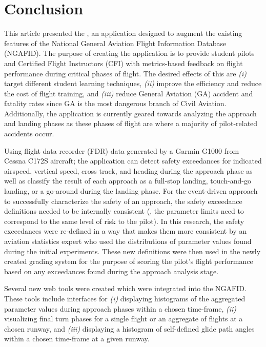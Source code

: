 
\section{Conclusion} \label{sec:conclusion}
	
	This article presented the \toolname, an application designed to augment the existing features of the National General Aviation Flight Information Database (NGAFID).  The purpose of creating the application is to provide student pilots and Certified Flight Instructors (CFI) with metrics-based feedback on flight performance during critical phases of flight.  The desired effects of this are \textit{(i)} target different student learning techniques, \textit{(ii)} improve the efficiency and reduce the cost of flight training, and \textit{(iii)} reduce General Aviation (GA) accident and fatality rates since GA is the most dangerous branch of Civil Aviation.  Additionally, the application is currently geared towards analyzing the approach and landing phases as these phases of flight are where a majority of pilot-related accidents occur.
	
	Using flight data recorder (FDR) data generated by a Garmin G1000 from Cessna C172S aircraft; the application can detect safety exceedances for indicated airspeed, vertical speed, cross track, and heading during the approach phase as well as classify the result of each approach as a full-stop landing, touch-and-go landing, or a go-around during the landing phase.  For the event-driven approach to successfully characterize the safety of an approach, the safety exceedance definitions needed to be internally consistent (\ie, the parameter limits need to correspond to the same level of risk to the pilot).  In this research, the safety exceedances were re-defined in a way that makes them more consistent by an aviation statistics expert who used the distributions of parameter values found during the initial experiments.  These new definitions were then used in the newly created grading system for the purpose of scoring the pilot's flight performance based on any exceedances found during the approach analysis stage.
	
	Several new web tools were created which were integrated into the NGAFID.  These tools include interfaces for \textit{(i)} displaying histograms of the aggregated parameter values during approach phases within a chosen time-frame, \textit{(ii)} visualizing final turn phases for a single flight or an aggregate of flights at a chosen runway, and \textit{(iii)} displaying a histogram of self-defined glide path angles within a chosen time-frame at a given runway.
	
